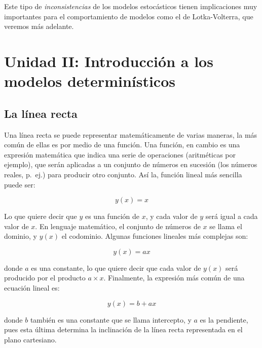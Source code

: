 \documentclass[
]{book}
\begin{document}
Este tipo de \emph{inconsistencias} de los modelos estocásticos tienen implicaciones muy importantes para el comportamiento de modelos como el de Lotka-Volterra, que veremos más adelante.

\hypertarget{unidad-ii-introducciuxf3n-a-los-modelos-determinuxedsticos}{%
\chapter{Unidad II: Introducción a los modelos determinísticos}\label{unidad-ii-introducciuxf3n-a-los-modelos-determinuxedsticos}}

\hypertarget{la-luxednea-recta}{%
\section{La línea recta}\label{la-luxednea-recta}}

Una línea recta se puede representar matemáticamente de varias maneras, la más común de ellas es por medio de una función. Una función, en cambio es una expresión matemática que indica una serie de operaciones (aritméticas por ejemplo), que serán aplicadas a un conjunto de números en sucesión (los números reales, p.~ej.) para producir otro conjunto. Así la, función lineal más sencilla puede ser:

\begin{equation}
    y(x) = x
\end{equation}

Lo que quiere decir que \(y\) es una función de \(x\), y cada valor de \(y\) será igual a cada valor de \(x\). En lenguaje matemático, el conjunto de números de \(x\) se llama el dominio, y \(y(x)\) el codominio. Algunas funciones lineales más complejas son:

\begin{equation}
    y(x) = ax
\end{equation}

donde \(a\) es una constante, lo que quiere decir que cada valor de \(y(x)\) será producido por el producto \(a \times x\). Finalmente, la expresión más común de una ecuación lineal es:

\begin{equation}
    y(x) = b + ax
\end{equation}

donde \(b\) también es una constante que se llama intercepto, y \(a\) es la pendiente, pues esta última determina la inclinación de la línea recta representada en el plano cartesiano.
\end{document}
